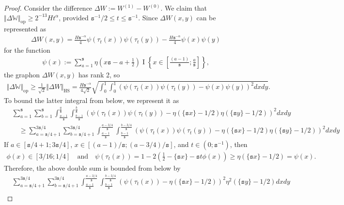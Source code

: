 \documentclass[11pt]{article}
\newcommand{\op}{\mathrm{op}}
\newcommand{\bbW}{\mathbb{W}}
\newcommand{\indicator}[1]{{\operatorname{I} \left \{ #1\right \}}}
\newcommand{\<}{\langle}
\renewcommand{\>}{\rangle}
\newcommand{\ts}{\mathtt{s}}
\theoremstyle{plain}
\theoremstyle{definition}
\theoremstyle{remark}
\begin{document}
{\begin{proof}
	
	Consider the difference $\Delta W := W^{(1)}-W^{(0)}$. We claim that $\Vert \Delta \bbW \Vert_{\op} \ge 2^{-13} H t^{\alpha}$, provided $\ts^{-1}/ 2 \le t \le \ts^{-1}$. Since $\Delta W(x, y)$ can be represented as
    \begin{align}
        \Delta W(x, y) = \frac{H \ts^{-\alpha}}{4} \psi(\tau_t(x)) \psi(\tau_t(y)) - \frac{H \ts^{-\alpha}}{4} \psi(x) \psi(y)
    \end{align}
    for the function
    \begin{align*}
        \psi(x) := \sum_{a = 1}^{\ts}  \eta \left (x\ts - a + \frac{1}{2} \right ) \indicator{x \in \left  [\frac{(a - 1)}{\ts}; \frac{a}{\ts} \right ]},
    \end{align*}
    the graphon $\Delta W(x, y)$ has rank 2, so
    \begin{align*}
        \Vert \Delta \bbW \Vert_{\op} \ge \frac{1}{\sqrt{2}}\Vert \Delta W \Vert_{\mathrm{HS}} = \frac{H\ts^{-\alpha}}{4\sqrt{2}} \sqrt{\int_0^1 \int_0^1 \left ( \psi(\tau_t(x)) \psi(\tau_t(y)) -  \psi(x) \psi(y) \right )^2 dx dy}. 
    \end{align*}
    To bound the latter integral from below, we represent it as 
    {\begin{align*}
        &\sum_{a = 1}^{\ts} \sum_{b = 1}^{\ts} \int_{\frac{a - 1}{\ts}}^{\frac{a}{\ts}} \int_{\frac{b - 1}{\ts}}^{\frac{b}{\ts}} \left ( \psi(\tau_t(x)) \psi(\tau_t(y)) -  \eta(\{\ts x\} - 1/2) \eta(\{\ts y\} - 1/2) \right )^2 dx dy \\
        & \quad \ge \sum_{a = \ts/4 + 1}^{3 \ts/4} \sum_{b = \ts/4 + 1}^{3 \ts/4} \int_{\frac{a - 1}{\ts}}^{\frac{a - 3/4}{\ts}} \int_{\frac{b -1}{\ts}}^{\frac{b- 3/4}{\ts}} \left ( \psi(\tau_t(x)) \psi(\tau_t(y)) -   \eta(\{\ts x\} - 1/2) \eta(\{\ts y\} - 1/2) \right )^2 dx dy
    \end{align*}}
    If $a \in [\ts/4 + 1; 3 \ts/4]$, $x \in [(a - 1)/\ts; (a - 3/4)/\ts]$, and $t \in (0; \ts^{-1})$, then
    \begin{align*}
        \phi(x) \in [3/16; 1/4] \quad \text{and} \quad \psi(\tau_t(x)) =   1 - 2 \left ( \frac{1}{2} - \{\ts x \}- \ts t \phi(x)\right ) \ge \eta(\{\ts x\} - 1/2) = \psi(x).
    \end{align*}
    Therefore, the above double sum is bounded from below by
    \begin{align*}
        & \sum_{a = \ts/4 + 1}^{3 \ts/4} \sum_{b = \ts/4 + 1}^{3 \ts/4} \int_{\frac{a - 1}{\ts}}^{\frac{a - 3/4}{\ts}} \int_{\frac{b -1}{\ts}}^{\frac{b- 3/4}{\ts}} \left ( \psi(\tau_t(x)) -   \eta(\{\ts x\} - 1/2)  \right )^2 \eta^2(\{\ts y\} - 1/2) dx dy \\

\end{align*}
\end{proof}}
\end{document}
